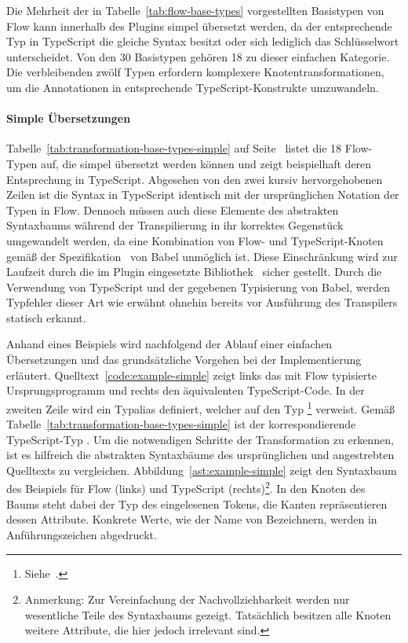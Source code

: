 {Die Mehrheit der in Tabelle~\ref{tab:flow-base-types} vorgestellten Basistypen von Flow kann innerhalb des Plugins simpel übersetzt werden, da der entsprechende Typ in TypeScript die gleiche Syntax besitzt oder sich lediglich das Schlüsselwort unterscheidet. Von den 30 Basistypen gehören 18 zu dieser einfachen Kategorie. Die verbleibenden zwölf Typen erfordern komplexere Knotentransformationen, um die Annotationen in entsprechende TypeScript-Konstrukte umzuwandeln.

\paragraph{Simple Übersetzungen}

Tabelle~\ref{tab:transformation-base-types-simple} auf Seite~\pageref{tab:transformation-base-types-simple} listet die 18 Flow-Typen auf, die simpel übersetzt werden können und zeigt beispielhaft deren Entsprechung in TypeScript. Abgesehen von den zwei kursiv hervorgehobenen Zeilen ist die Syntax in TypeScript identisch mit der ursprünglichen Notation der Typen in Flow. Dennoch müssen auch diese Elemente des abstrakten Syntaxbaums während der Transpilierung in ihr korrektes Gegenstück umgewandelt werden, da eine Kombination von Flow- und TypeScript-Knoten gemäß der Spezifikation~\autocite{BABEL:PARSER_SPEC} von Babel unmöglich ist. Diese Einschränkung wird zur Laufzeit durch die im Plugin eingesetzte Bibliothek \,\autocite{BABEL:TYPES} sicher gestellt. Durch die Verwendung von TypeScript und der gegebenen Typisierung von Babel, werden Typfehler dieser Art wie erwähnt ohnehin bereits vor Ausführung des Transpilers statisch erkannt.

\medbreak


Anhand eines Beispiels wird nachfolgend der Ablauf einer einfachen Übersetzungen und das grundsätzliche Vorgehen bei der Implementierung erläutert. Quelltext~\ref{code:example-simple} zeigt links das mit Flow typisierte Ursprungsprogramm und rechts den äquivalenten TypeScript-Code. In der zweiten Zeile wird ein Typalias definiert, welcher auf den Typ
\footnote{Siehe~\autocite[Mixed Types]{FLOW:TYPE_ANNOTATIONS}.} verweist. Gemäß Tabelle~\ref{tab:transformation-base-types-simple} ist der korrespondierende TypeScript-Typ . Um die notwendigen Schritte der Transformation zu erkennen, ist es hilfreich die abstrakten Syntaxbäume des ursprünglichen und angestrebten Quelltexts zu vergleichen. Abbildung~\ref{ast:example-simple} zeigt den Syntaxbaum des Beispiels für Flow (links) und TypeScript (rechts)\footnote{Anmerkung: Zur Vereinfachung der Nachvollziehbarkeit werden nur wesentliche Teile des Syntaxbaums gezeigt. Tatsächlich besitzen alle Knoten weitere Attribute, die hier jedoch irrelevant sind.}. In den Knoten des Baums steht dabei der Typ des eingelesenen Tokens, die Kanten repräsentieren dessen Attribute. Konkrete Werte, wie der Name von Bezeichnern, werden in Anführungszeichen abgedruckt.

}
